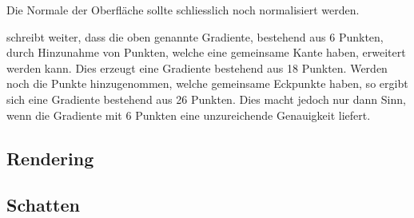 Die Normale der Oberfläche sollte schliesslich noch normalisiert werden.

\cite{hart_ray_1989} schreibt weiter, dass die oben genannte Gradiente,
bestehend aus 6 Punkten, durch Hinzunahme von Punkten, welche eine
gemeinsame Kante haben, erweitert werden kann. Dies erzeugt eine
Gradiente bestehend aus 18 Punkten. Werden noch die Punkte
hinzugenommen, welche gemeinsame Eckpunkte haben, so ergibt sich eine
Gradiente bestehend aus 26 Punkten.
Dies macht jedoch nur dann Sinn, wenn die Gradiente mit 6 Punkten eine
unzureichende Genauigkeit liefert.

\subsection{Rendering}
\label{sec:rendering_implicit_surfaces_Rendering}

\subsection{Schatten}
\label{sec:rendering_implicit_surfaces_shadows}

